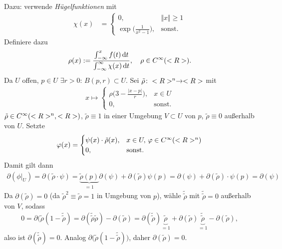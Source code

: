\begin{itemize}
	Dazu: verwende \emph{Hügelfunktionen} mit \begin{align*}
		\chi(x) &= \begin{cases}
			0,&\Vert x\Vert\ge 1\\
			\exp\Big(\frac{1}{x^2-1}\Big),&\text{sonst}.
		\end{cases}
	\end{align*}
	Definiere dazu \begin{align*}
		\rho(x) := \frac{\int_{-\infty}^x f(t)\,\mathrm dt}{\int_{-\infty}^\infty \chi(x)\,\mathrm dt},\quad\rho\in C^\infty(<R>).
	\end{align*}
	Da $U$ offen, $p\in U$ $\exists r > 0$: $B(p,r)\subset U$. Sei $\tilde\rho\colon<R>^n\to<R>$ mit \begin{align*}
		x\mapsto\begin{cases}
			\rho\Big( 3 - \frac{\vert x-p\vert}{r}\Big),&x\in U\\
			0,&\text{sonst}.
		\end{cases}
	\end{align*}
	$\tilde\rho\in C^\infty(<R>^n,<R>)$, $\tilde \rho\equiv 1$ in einer Umgebung $V\subset U$ von $p$, $\tilde\rho \equiv 0$ außerhalb von $U$. Setzte \begin{align*}
		\varphi(x) = \begin{cases}
			\psi(x)\cdot\tilde\rho(x),&x\in U,\,\varphi\in C^\infty(<R>^n)\\0,&\text{sonst}.
		\end{cases}
	\end{align*}
	Damit gilt dann \begin{align*}
		\partial(\phi\big|_U) = \partial(\tilde\rho\cdot\psi) = \underbrace{\tilde\rho(p)}_{=1}\partial(\psi)+\partial(\tilde\rho) \psi(p) = \partial(\psi) + \partial(\tilde\rho)\cdot\psi(p) = \partial(\psi)
	\end{align*}
	Da $\partial(\tilde\rho) = 0$ (da $\tilde\rho^2\equiv\tilde\rho=1$ in Umgebung von $p$), wähle $\tilde{\tilde\rho}$ mit $\tilde{\tilde\rho}=0$ außerhalb von $V$, sodass \begin{align*}
		0 = \partial\big(\tilde\rho(1-\tilde{\tilde\rho}) = \partial(\tilde{\tilde\rho}\tilde\rho) - \partial(\tilde\rho) = \partial(\tilde{\tilde\rho})\underbrace{\tilde\rho}_{=1}+\partial(\tilde\rho)\underbrace{\tilde{\tilde\rho}}_{=1} - \partial(\tilde\rho),
	\end{align*}
	also ist $\partial(\tilde{\tilde\rho})=0$. Analog $\partial\big(\tilde\rho(1-\tilde{\tilde\rho})\big)$, daher $\partial(\tilde\rho) = 0$.
\end{itemize}

